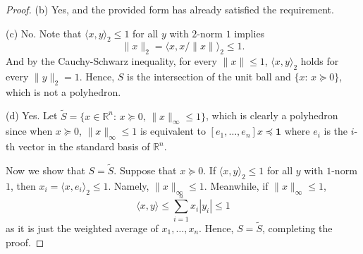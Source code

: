 \begin{proof}
    (b) Yes, and the provided form has already satisfied the requirement.\par
    (c) No. Note that $\langle x,y\rangle_2\le1$ for all $y$ with $2$-norm $1$ 
    implies
    \[
      \|x\|_2 = \langle x,x/\|x\|\rangle_2 \le 1.
    \]
    And by the Cauchy-Schwarz inequality, for every $\|x\|\le 1$, $\langle x,y
    \rangle_2$ holds for every $\|y\|_2=1$. Hence, $S$ is the intersection of
    the unit ball and $\{x:\,x\succeq 0\}$, which is not a polyhedron.\par
    (d) Yes. Let $\tilde{S}=\{x\in\mathbb{R}^n:\,x\succeq 0,\,\|x\|_\infty\le 1
    \}$, which is clearly a polyhedron since when $x\succeq 0$, $\|x\|_\infty\le
    1$ is equivalent to $[e_1,\dots,e_n]x\preceq \mathbf{1}$ where $e_i$ is the 
    $i$-th vector in the standard basis of $\mathbb{R}^n$.\par
    Now we show that $S=\tilde{S}$. Suppose that $x\succeq 0$. If $\langle x,y
    \rangle_2\le 1$ for all $y$ with $1$-norm $1$, then $x_i = \langle x,e_i
    \rangle_2 \le 1$. Namely, $\|x\|_\infty\le 1$. Meanwhile, if $\|x\|_\infty
    \le 1$, 
    \[
      \langle x,y\rangle \le \sum_{i=1}^n x_i|y_i| \le 1
    \]
    as it is just the weighted average of $x_1,\dots,x_n$. Hence, $S=\tilde{S}$,
    completing the proof.
  \end{proof}

